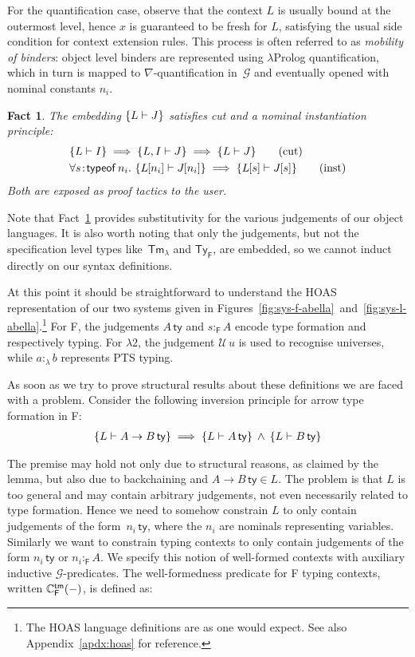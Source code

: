 \documentclass[a4paper,UKenglish]{lipics-v2016}
\newcommand{\ms}{\,}
\newcommand{\mrel}[1]{\mathrel{\ms #1 \ms}}
\newcommand{\mAnd}{\mrel{\wedge}}
\newcommand{\mAll}[1]{\ensuremath{\forall} #1.\ms\ms}
\newcommand{\SysL}{$\lambda2$\xspace}
\newcommand{\TyF}{\ensuremath{\mathsf{Ty_{F}}}}
\newcommand{\TmL}{\ensuremath{\mathsf{Tm_{\lambda}}}}
\newcommand{\of}{\ensuremath{\!:\!}}
\newcommand{\istyFh}[1]{\ensuremath{#1\ms\mathsf{ty}}}
\newcommand{\typingFh}[2]{\ensuremath{#1 \mathbin{:_{\mathsf{F}}} #2}}
\newcommand{\sortLh}[1]{\ensuremath{\mathcal{U}\ms#1}}
\newcommand{\typingLh}[2]{\ensuremath{#1 \mathbin{:_{\lambda}} #2}}
\newcommand{\subst}[1]{\hphantom{|}\!\![{#1}]}
\theoremstyle{plain}
\newtheorem{fact}[theorem]{Fact}
\begin{document}
For the quantification case, observe that the context $L$ is usually bound at the outermost level, hence $x$ is guaranteed to be fresh for $L$, satisfying the usual side condition for context extension rules.
This process is often referred to as \emph{mobility of binders}: object level binders are represented using $\lambda$Prolog quantification, which in turn is mapped to $\nabla$-quantification in~$\mathcal{G}$ and eventually opened with nominal constants $n_i$.
\begin{fact}
  \label{fac:ab-cut-inst}
  The embedding $\{L \vdash J\}$ satisfies cut and a nominal instantiation principle:
  \begin{align*}
    &\aj{L}{I} \implies \aj{L,I}{J} \implies \aj{L}{J} \tag{cut} \\
    &\mAll{s \of \mathsf{typeof}\, n_i} \aj{L\subst{n_i}}{J\subst{n_i}} \implies \aj{L\subst{s}}{J\subst{s}} \tag{inst}
  \end{align*}
  Both are exposed as proof tactics to the user.\hfill\qedsymbol
\end{fact}
Note that Fact~\ref{fac:ab-cut-inst} provides substitutivity for the various judgements of our object languages.
It is also worth noting that only the judgements, but not the specification level types like~$\TmL$ and $\TyF$, are embedded, so we cannot induct directly on our syntax definitions.

At this point it should be straightforward to understand the HOAS representation of our two systems given in Figures~\ref{fig:sys-f-abella}~and~\ref{fig:sys-l-abella}.\footnote{The HOAS language definitions are as one would expect. See also Appendix~\ref{apdx:hoas} for reference.}
For F, the judgements $\istyFh{A}$ and $\typingFh{s}{A}$ encode type formation and respectively typing.
For \SysL, the judgement $\sortLh{u}$ is used to recognise universes, while $\typingLh{a}{b}$ represents PTS typing.

As soon as we try to prove structural results about these definitions we are faced with a problem.
Consider the following inversion principle for arrow type formation in F:
\begin{align*}
  \aj{L}{\istyFh{A \to B}} \implies \aj{L}{\istyFh{A}} \mAnd \aj{L}{\istyFh{B}}
\end{align*}

The premise may hold not only due to structural reasons, as claimed by the lemma, but also due to backchaining and $\istyFh{A \to B} \in L$.
The problem is that $L$ is too general and may contain arbitrary judgements, not even necessarily related to type formation.
Hence we need to somehow constrain $L$ to only contain judgements of the form~$\istyFh{n_i}$, where the $n_i$ are nominals representing variables.
Similarly we want to constrain typing contexts to only contain judgements of the form $\istyFh{n_i}$ or $\typingFh{n_i}{A}$.
We specify this notion of well-formed contexts  with auxiliary inductive $\mathcal{G}$-predicates.
The well-formedness predicate for F typing contexts, written $\mathbb{C}_{\mathsf{F}}^{\mathsf{tm}} (-)$, is defined as:
\end{document}
